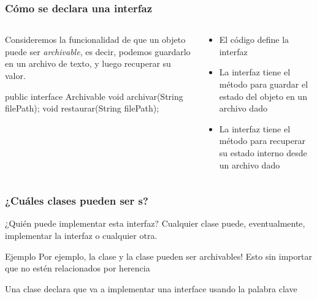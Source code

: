 \documentclass{beamer}
\begin{document}
\begin{frame}[fragile]
  \frametitle{Cómo se declara una interfaz}

  \begin{columns}
    \begin{column}{0.5\textwidth}
      \begin{small}
        Consideremos la funcionalidad de que un objeto puede ser
        \emph{archivable}, es decir, podemos guardarlo en un archivo
        de texto, y luego recuperar su valor.
       \end{small}

        \begin{jsmall}        
        public interface Archivable {
          void archivar(String filePath);
          void restaurar(String filePath);
        }        
      \end{jsmall}      
    \end{column}
    \begin{column}{0.5\textwidth}
        \begin{itemize}
        \item El código define la interfaz 
          
        \item La interfaz tiene el método  para
          guardar el estado del objeto en un archivo dado
          
        \item La interfaz tiene el método  para
          recuperar su estado interno desde un archivo dado
          
        \end{itemize}

    \end{column}
  \end{columns}  
\end{frame}

\begin{frame}
  \frametitle{¿Cuáles clases pueden ser s?}

  \begin{block}{¿Quién puede implementar esta interfaz?}
    Cualquier clase puede, eventualmente, implementar la interfaz
     o cualquier otra.
  \end{block}

  \begin{block}{Ejemplo}
    Por ejemplo, la clase  y la clase 
    pueden ser archivables! Esto sin importar que no estén
    relacionados por herencia
  \end{block}

  \begin{block}{}
    Una clase declara que va a implementar una interface usando la
    palabra clave 
  \end{block}
  
\end{frame}
\end{document}
